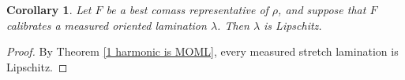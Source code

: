 \documentclass[reqno,11pt]{amsart}
\DeclareMathOperator{\card}{card}
\newcommand{\Euler}{\mathbf \chi}
\newcommand{\dfn}[1]{\emph{#1}\index{#1}}
\newtheorem{corollary}[theorem]{Corollary}
\theoremstyle{definition}
\newtheorem{definition}[theorem]{Definition}
\numberwithin{equation}{section}
\newcommand\todo[1]{\textcolor{red}{TODO: #1}}
\begin{document}
\begin{corollary}
Let $F$ be a best comass representative of $\rho$, and suppose that $F$ calibrates a measured oriented lamination $\lambda$.
Then $\lambda$ is Lipschitz.
\end{corollary}
\begin{proof}
By Theorem \ref{1 harmonic is MOML}, every measured stretch lamination is Lipschitz.
\end{proof}






\end{document}
